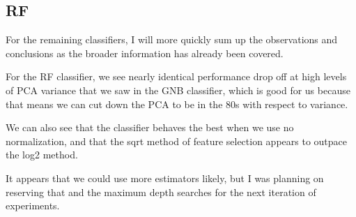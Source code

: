 \documentclass[12pt]{article}
\begin{document}
\subsection{RF}

For the remaining classifiers, I will more quickly sum up the observations and conclusions as the broader information has 
already been covered.

For the RF classifier, we see nearly identical performance drop off at high levels of PCA variance that we saw in the 
GNB classifier, which is good for us because that means we can cut down the PCA to be in the 80s with respect to variance.

We can also see that the classifier behaves the best when we use no normalization, and that the sqrt method of feature 
selection appears to outpace the log2 method.

It appears that we could use more estimators likely, but I was planning on reserving that and the maximum depth searches 
for the next iteration of experiments.
\end{document}
